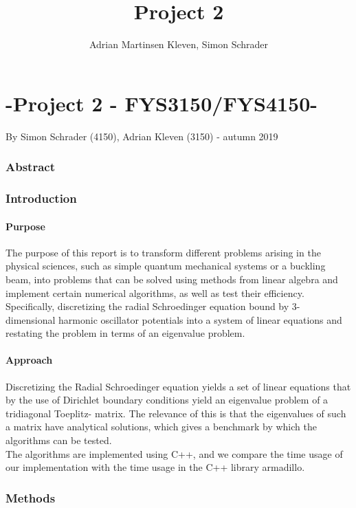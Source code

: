 \documentclass[10pt,a4paper]{article}
\author{Adrian Martinsen Kleven, Simon Schrader}
\title{Project 2}
\begin{document}
\part*{-Project 2 - FYS3150/FYS4150-
}
{\large By Simon Schrader (4150), Adrian Kleven (3150) - autumn 2019
}
\tableofcontents

\listoffigures
\listoftables

 
\clearpage
 
\section{Abstract}

\section{Introduction}
\subsection{Purpose} 
The purpose of this report is to transform different problems arising in the physical sciences, such as simple quantum mechanical systems or a buckling beam, into problems that can be solved using methods from linear algebra and implement certain numerical algorithms, as well as test their efficiency.
Specifically, discretizing the radial Schroedinger equation bound by 3- dimensional harmonic oscillator potentials into a system of linear equations and restating the problem in terms of an eigenvalue problem.
\subsection{Approach}
Discretizing the Radial Schroedinger equation yields a set of linear equations that by the use of Dirichlet boundary conditions yield an eigenvalue problem of a tridiagonal Toeplitz- matrix. The relevance of this is that the eigenvalues of such a matrix have analytical solutions, which gives a benchmark by which the algorithms can be tested.\\The algorithms are implemented using C++, and we compare the time usage of our implementation with the time usage in the C++ library armadillo.
\section{Methods}
\end{document}
